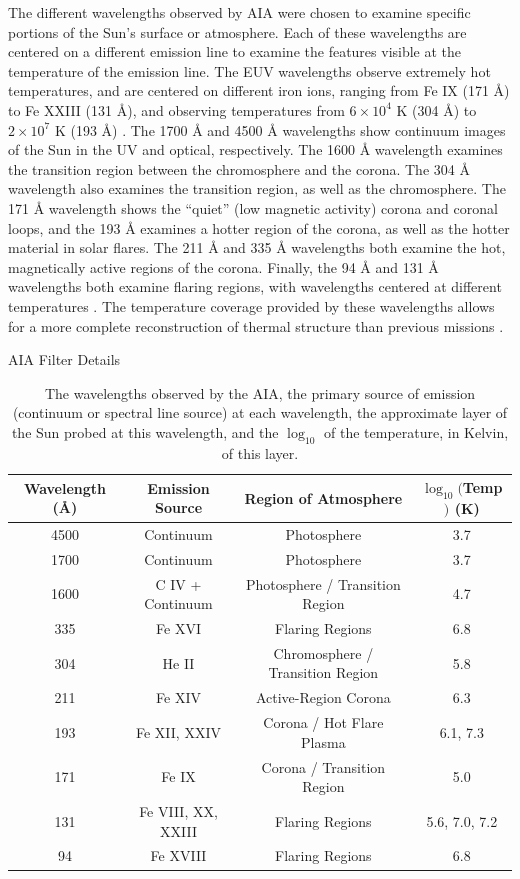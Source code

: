 \documentclass[12pt, letterpaper]{article}
\begin{document}
The different wavelengths observed by AIA were chosen to examine specific portions of the Sun’s surface or atmosphere. Each of these wavelengths are centered on a different emission line to examine the features visible at the temperature of the emission line. The EUV wavelengths observe extremely hot temperatures, and are centered on different iron ions, ranging from Fe IX (171 Å) to Fe XXIII (131 Å), and observing temperatures from $6 \times 10^4$ K (304 Å) to $2 \times 10^7$ K (193 Å) \cite{Lemen2012}. The 1700 Å and 4500 Å wavelengths show continuum images of the Sun in the UV and optical, respectively. The 1600 Å wavelength examines the transition region between the chromosphere and the corona. The 304 Å wavelength also examines the transition region, as well as the chromosphere. The 171 Å wavelength shows the “quiet” (low magnetic activity) corona and coronal loops, and the 193 Å examines a hotter region of the corona, as well as the hotter material in solar flares. The 211 Å and 335 Å wavelengths both examine the hot, magnetically active regions of the corona. Finally, the 94 Å and 131 Å wavelengths both examine flaring regions, with wavelengths centered at different temperatures \cite{Zell2015}. The temperature coverage provided by these wavelengths allows for a more complete reconstruction of thermal structure than previous missions \cite{AIA_ConceptReport}.

\begin{table}[!htb]
	\centering
	\caption*{AIA Filter Details}
	\begin{tabular}{||c| c | c | c ||}
		\hline
		Wavelength (\AA) & Emission Source & Region of Atmosphere & $\log_{10}($Temp$)$ (K)\\ [0.5ex] 
		\hline\hline
		4500 & Continuum & Photosphere & 3.7 \\
		\hline
		1700 & Continuum & Photosphere & 3.7 \\
		\hline
		1600 & C IV + Continuum & Photosphere / Transition Region & 4.7 \\
		\hline
		335 & Fe XVI & Flaring Regions & 6.8 \\
		\hline
		304 & He II & Chromosphere / Transition Region & 5.8 \\
		\hline
		211 & Fe XIV & Active-Region Corona & 6.3 \\
		\hline
		193 & Fe XII, XXIV & Corona / Hot Flare Plasma & 6.1, 7.3 \\
		\hline 
		171 & Fe IX & Corona / Transition Region & 5.0 \\
		\hline
		131 & Fe VIII, XX, XXIII & Flaring Regions & 5.6, 7.0, 7.2 \\
		\hline
		94 & Fe XVIII & Flaring Regions & 6.8 \\
		\hline
		
	\end{tabular}
	\vspace{0.5em}
	\caption{The wavelengths observed by the AIA, the primary source of emission (continuum or spectral line source) at each wavelength, the approximate layer of the Sun probed at this wavelength, and the $\log_{10}$ of the temperature, in Kelvin, of this layer. \cite{AIA_ConceptReport}}
	\label{AIA_wavelengths}
\end{table}
\end{document}
